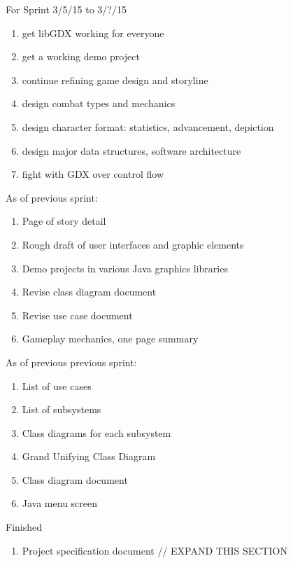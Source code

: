 \documentclass[12pt]{article}
\begin{document}
\begin{section}{For Sprint 3/5/15 to 3/?/15}
\begin{enumerate}

\item get libGDX working for everyone
\item get a working demo project

\item continue refining game design and storyline
\item design combat types and mechanics
\item design character format: statistics, advancement, depiction
\item design major data structures, software architecture

\item fight with GDX over control flow


\end{enumerate}
\end{section}


\begin{section}{As of previous sprint:}
\begin{enumerate}
\item Page of story detail
\item Rough draft of user interfaces and graphic elements
\item Demo projects in various Java graphics libraries
\item Revise class diagram document
\item Revise use case document
\item Gameplay mechanics, one page summary
\end{enumerate}
\end{section}

\begin{section}{As of previous previous sprint:}
\begin{enumerate}
\item List of use cases
\item List of subsystems
\item Class diagrams for each subsystem
\item Grand Unifying Class Diagram
\item Class diagram document
\item Java menu screen
\end{enumerate}
\end{section}

\begin{section}{Finished}
\begin{enumerate}
\item Project specification document
// EXPAND THIS SECTION
\end{enumerate}
\end{section}
\end{document}
